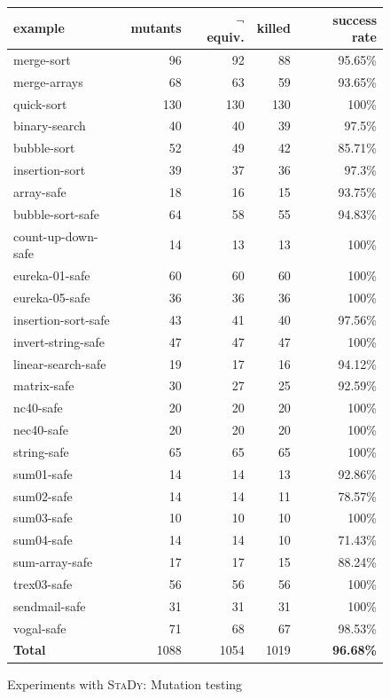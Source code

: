 \begin{figure}[tb]\scriptsize
  \begin{center}
    \begin{tabular}{lrrrr}
      \hline
      example & mutants & $\lnot$ equiv. & killed & success rate \\ \hline
      merge-sort & 96  & 92 & 88 & 95.65\% \\ \hline
      merge-arrays & 68 & 63 & 59 & 93.65\% \\ \hline
      quick-sort & 130 & 130 & 130 & 100\% \\ \hline
      binary-search & 40 & 40 & 39 & 97.5\% \\ \hline
      bubble-sort & 52 & 49 & 42 & 85.71\% \\ \hline
      insertion-sort & 39 & 37 & 36 & 97.3\% \\ \hline
      array-safe & 18 & 16 & 15 & 93.75\% \\ \hline
      bubble-sort-safe & 64 & 58 & 55 & 94.83\% \\ \hline
      count-up-down-safe & 14 & 13 & 13 & 100\% \\ \hline
      eureka-01-safe & 60 & 60 & 60 & 100\% \\ \hline
      eureka-05-safe & 36 & 36 & 36 & 100\% \\ \hline
      insertion-sort-safe & 43 & 41 & 40 & 97.56\% \\ \hline
      invert-string-safe & 47 & 47 & 47 & 100\% \\ \hline
      linear-search-safe & 19 & 17 & 16 & 94.12\% \\ \hline
      matrix-safe & 30 & 27 & 25 & 92.59\% \\ \hline
      nc40-safe & 20 & 20 & 20 & 100\% \\ \hline
      nec40-safe & 20 & 20 & 20 & 100\% \\ \hline
      string-safe & 65 & 65 & 65 & 100\% \\ \hline
      sum01-safe & 14 & 14 & 13 & 92.86\% \\ \hline
      sum02-safe & 14 & 14 & 11 & 78.57\% \\ \hline
      sum03-safe & 10 & 10 & 10 & 100\% \\ \hline
      sum04-safe & 14 & 14 & 10 & 71.43\% \\ \hline
      sum-array-safe & 17 & 17 & 15 & 88.24\% \\ \hline
      trex03-safe & 56 & 56 & 56 & 100\% \\ \hline
      sendmail-safe & 31 & 31 & 31 & 100\% \\ \hline
      vogal-safe & 71 & 68 & 67 & 98.53\% \\ \hline
      \textbf{Total} & 1088 & 1054 & 1019 & \textbf{96.68\%} \\ \hline
    \end{tabular}
  \end{center}
  \vspace{-3mm}
  \caption{Experiments with \textsc{StaDy}: Mutation testing}
  \label{fig:scam-experiments2}
  \vspace{-3mm}
\end{figure}


